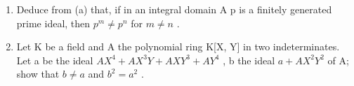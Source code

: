 \begin{enumerate}
\def\labelenumi{(\alph{enumi})}
\setcounter{enumi}{1}
\item
  Deduce from (a) that, if in an integral domain A p is a finitely generated prime ideal, then \(p^{m} \neq p^{n}\) for \(m \neq n\) .
\item
  Let K be a field and A the polynomial ring K{[}X, Y{]} in two indeterminates. Let a be the ideal \(AX^{4} + AX^{3}Y + AXY^{3} + AY^{4}\) , b the ideal \(a + AX^{2}Y^{2}\) of A; show that \(b \neq a\) and \(b^{2} = a^{2}\) .
\end{enumerate}
\relax{}
